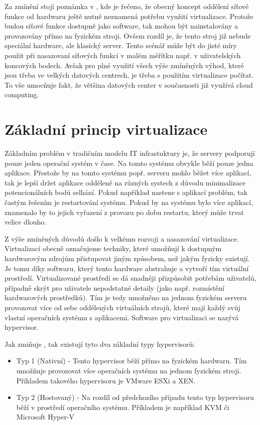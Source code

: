 Za zmínění stojí poznámka v \cite{NFVState}, kde je řečeno, že obecný koncept oddělení síťové funkce od hardwaru ještě nutně neznamená potřebu využití virtualizace. Protože budou síťové funkce dostupně jako software, tak mohou být nainstalovány a provozovány přímo na fyzickém stroji. Ovšem rozdíl je, že tento stroj již nebude speciální hardware, ale klasický server. Tento scénář může být do jisté míry použit při nasazovaní síťových funkcí v malém měřítku např. v uživatelských koncových bodech. Avšak pro plné využití všech výše zmíněných výhod, které jsou třeba ve velkých datových centrech, je třeba s použitím virtualizace počítat. To vše umocňuje fakt, že většina datových center v současnosti již využívá cloud computing. 

\section{Základní princip virtualizace}

Základním problém v tradičním modelu IT infrastuktury je, že servery podporují pouze jeden operační systém v čase. Na tomto systému obvykle běží pouze jedna aplikace. Přestože by na tomto systému popř. serveru mohlo běžet více aplikací, tak je lepší držet aplikace odděleně na různých systech z důvodu minimalizace potencionálních bodů selhání. Pokud například nastene s aplikací problém, tak častým řešením je restartování systému. Pokud by na systému bylo více aplikací, znamenalo by to jejich vyřazení z provozu po dobu restartu, který může trvat velice dlouho. \cite{VM_book}

Z výše zmíněných důvodů došlo k velkému rozvoji a nasazování virtualizace. Virtualizací obecně označujeme techniky, které umožňují k dostupným hardwarovým zdrojům přistupovat jiným způsobem, než jakým fyzicky existují. Je tomu díky softwaru, který tento hardware abstrahuje a vytvoří tím virtuální prostředí. Virtualizované prostředí se dá snadněji přizpůsobit potřebám uživatelů, případně skrýt pro uživatele nepodstatné detaily (jako např. rozmístění hardwarových prostředků). Tím je tedy umožněno na jednom fyzickém serveru provozovat více od sebe oddělených virtuálních strojů, které mají každý svůj vlastní operačních systému s aplikacemi. Software pro virtualizaci se nazývá hypervisor.\cite{VM_book}

Jak zmiňuje \cite{VM_architektura}, tak existují tyto dva základní typy hypervisorů:

\begin{itemize}
\item Typ 1 (Nativní) - Tento hypervisor běží přímo na fyzickém hardwaru. Tím umožňuje provozovat více operačních systému na jednom fyzickém stroji. Příkladem takového hypervisoru je VMware ESXi a XEN.
\item Typ 2 (Hostovaný) - Na rozdíl od předchozího případu tento typ hypervisoru běží v prostředí operačního systému. Příkladem je například KVM či Microsoft Hyper-V
\end{itemize}


